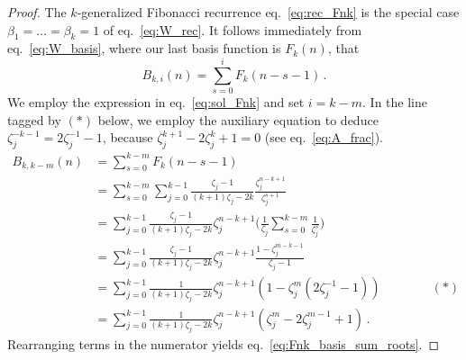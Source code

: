 \documentclass[10pt,a4paper]{amsart}
\begin{document}
\begin{proof}
The $k$-generalized Fibonacci recurrence eq.~\eqref{eq:rec_Fnk} is the special case $\beta_1=\dots=\beta_k=1$ of eq.~\eqref{eq:W_rec}.
It follows immediately from eq.~\eqref{eq:W_basis}, where our last basis function is $F_k(n)$, that
\begin{equation}
\label{eq:Fnk_basis}
B_{k,i}(n) = \sum_{s=0}^i F_k(n-s-1) \,.
\end{equation}
We employ the expression in eq.~\eqref{eq:sol_Fnk} and set $i=k-m$.
In the line tagged by $(*)$ below,
we employ the auxiliary equation to deduce $\zeta_j^{-k-1} = 2\zeta_j^{-1}-1$, because $\zeta_j^{k+1}-2\zeta_j^k+1=0$ (see eq.~\eqref{eq:A_frac}).
\begin{equation}
\begin{split}
  B_{k,k-m}(n) &= \sum_{s=0}^{k-m} F_k(n-s-1)
  \\
  &= \sum_{s=0}^{k-m} \sum_{j=0}^{k-1} \frac{\zeta_j-1}{(k+1)\zeta_j-2k} \frac{\zeta_j^{n-k+1}}{\zeta_j^{s+1}}
  \\
  &= \sum_{j=0}^{k-1} \frac{\zeta_j-1}{(k+1)\zeta_j-2k} \zeta_j^{n-k+1} \biggl(\frac{1}{\zeta_j}\sum_{s=0}^{k-m} \frac{1}{\zeta_j^s}\biggr)
  \\
  &= \sum_{j=0}^{k-1} \frac{\zeta_j-1}{(k+1)\zeta_j-2k} \zeta_j^{n-k+1} \frac{1-\zeta_j^{m-k-1}}{\zeta_j-1}
  \\
  &= \sum_{j=0}^{k-1} \frac{1}{(k+1)\zeta_j-2k} \zeta_j^{n-k+1} (1 -\zeta_j^m(2\zeta_j^{-1}-1)) \qquad\qquad (*)
  \\
  &= \sum_{j=0}^{k-1} \frac{1}{(k+1)\zeta_j-2k} \zeta_j^{n-k+1} (\zeta_j^m -2\zeta_j^{m-1} +1) \,.
\end{split}
\end{equation}
Rearranging terms in the numerator yields eq.~\eqref{eq:Fnk_basis_sum_roots}.
\end{proof}
\end{document}
